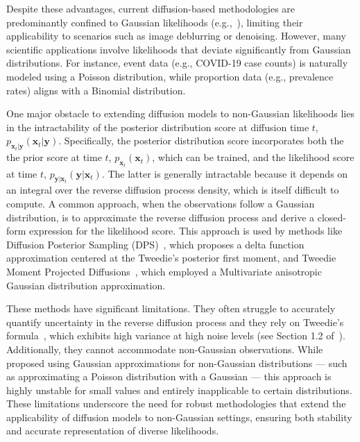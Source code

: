 Despite these advantages, current diffusion-based methodologies are predominantly confined to Gaussian likelihoods (e.g.,~\citet{kadkhodaie2021, kawar2021, kawar2022, chung2023, song2023pseudoinverseguided, boys2024, rozet2024}), limiting their applicability to scenarios such as image deblurring or denoising. 
However, many scientific applications involve likelihoods that deviate significantly from Gaussian distributions. For instance, event data (e.g., COVID-19 case counts) is naturally modeled using a Poisson distribution, while proportion data (e.g., prevalence rates) aligns with a Binomial distribution. 

One major obstacle to extending diffusion models to non-Gaussian likelihoods lies in the intractability of the posterior distribution score at diffusion time $t$, $ p_{\mathbf{x}_t | \mathbf{y}}(\mathbf{x}_t | \mathbf{y})$. Specifically, the posterior distribution score incorporates both the the prior score at time $t$, $ p_{\mathbf{x}_t}(\mathbf{x}_t)$, which can be trained, and the likelihood score at time $t$, $p_{\mathbf{y} | \mathbf{x}_t }(\mathbf{y}| \mathbf{x}_t )$. 
The latter is generally intractable because it depends on an integral over the reverse diffusion process density, which is itself difficult to compute. 
A common approach, when the observations follow a Gaussian distribution, is to approximate the reverse diffusion process and derive a closed-form expression for the likelihood score.
This approach is used by methods like Diffusion Posterior Sampling (DPS)~\citep{chung2023}, which proposes a delta function approximation centered at the Tweedie's posterior first moment, and Tweedie Moment Projected Diffusions~\citep{boys2024}, which employed a Multivariate anisotropic Gaussian distribution approximation. 


These methods have significant limitations. They often struggle to accurately quantify uncertainty in the reverse diffusion process and they rely on Tweedie’s formula~\citep{Efron2011}, which exhibits high variance at high noise levels (see Section 1.2 of~\citet{target_score_matching}). 
Additionally, they cannot accommodate non-Gaussian observations. While~\citet{chung2023} proposed using Gaussian approximations for non-Gaussian distributions --- such as approximating a Poisson distribution with a Gaussian --- this approach is highly unstable for small values and entirely inapplicable to certain distributions.
These limitations underscore the need for robust methodologies that extend the applicability of diffusion models to non-Gaussian settings, ensuring both stability and accurate representation of diverse likelihoods.

